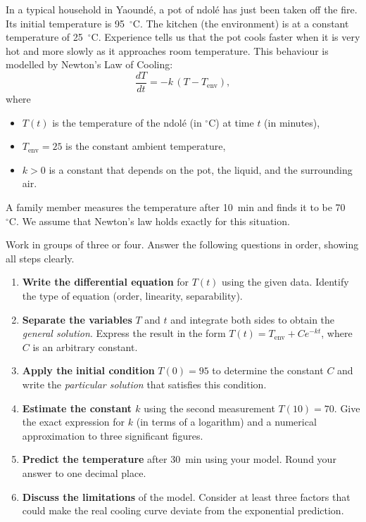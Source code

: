 \documentclass[11pt]{article}
\newcommand{\cle}[1]{{\popxbold\color{popdark}#1}}
\newcounter{popsec}
\newcounter{popsub}
\newcommand{\courssub}[1]{%
  \stepcounter{popsub}%
  \par\vspace{9pt}\noindent{\popxbold\fontsize{11.5}{13}\selectfont\color{popink}{\color{poporange}\thepopsec.\thepopsub}\hspace{6pt}#1}\par\nopagebreak\vspace{4pt}
}
\begin{document}
\courssub{Situation}
\begin{experience}
In a typical household in Yaoundé, a pot of ndolé has just been taken off the fire. Its initial temperature is \SI{95}{\ensuremath{{}^{\circ}\mathrm{C}}}. The kitchen (the environment) is at a constant temperature of \SI{25}{\ensuremath{{}^{\circ}\mathrm{C}}}. Experience tells us that the pot cools faster when it is very hot and more slowly as it approaches room temperature. This behaviour is modelled by \cle{Newton's Law of Cooling}:
\[
\frac{dT}{dt} = -k\,(T - T_{\text{env}}),
\]
where
\begin{itemize}
\item $T(t)$ is the temperature of the ndolé (in \si{\ensuremath{{}^{\circ}\mathrm{C}}}) at time $t$ (in minutes),
\item $T_{\text{env}} = 25$ is the constant ambient temperature,
\item $k > 0$ is a constant that depends on the pot, the liquid, and the surrounding air.
\end{itemize}
A family member measures the temperature after \SI{10}{\minute} and finds it to be \SI{70}{\ensuremath{{}^{\circ}\mathrm{C}}}. We assume that Newton's law holds exactly for this situation.
\end{experience}

\courssub{Tasks}
Work in groups of three or four. Answer the following questions in order, showing all steps clearly.

\begin{enumerate}
\item \textbf{Write the differential equation} for $T(t)$ using the given data. Identify the type of equation (order, linearity, separability).
\item \textbf{Separate the variables} $T$ and $t$ and integrate both sides to obtain the \emph{general solution}. Express the result in the form $T(t) = T_{\text{env}} + C e^{-kt}$, where $C$ is an arbitrary constant.
\item \textbf{Apply the initial condition} $T(0) = 95$ to determine the constant $C$ and write the \emph{particular solution} that satisfies this condition.
\item \textbf{Estimate the constant $k$} using the second measurement $T(10) = 70$. Give the exact expression for $k$ (in terms of a logarithm) and a numerical approximation to three significant figures.
\item \textbf{Predict the temperature} after \SI{30}{\minute} using your model. Round your answer to one decimal place.
\item \textbf{Discuss the limitations} of the model. Consider at least three factors that could make the real cooling curve deviate from the exponential prediction.
\end{enumerate}
\end{document}

